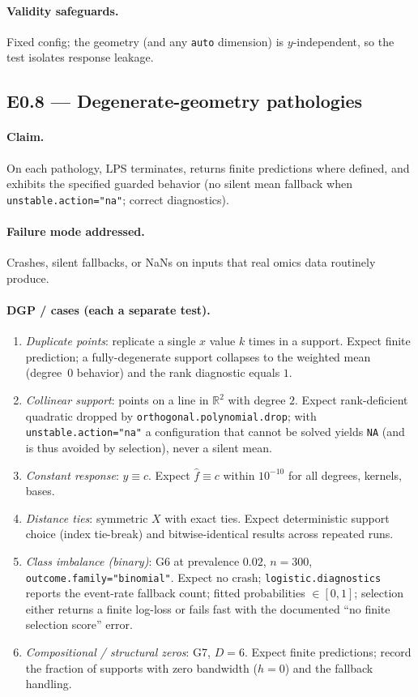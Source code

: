\documentclass[11pt]{article}
\newcommand{\code}[1]{\texttt{#1}}
\begin{document}
\paragraph{Validity safeguards.} Fixed config; the geometry (and any \code{auto} dimension) is
$y$-independent, so the test isolates response leakage.

\subsection{E0.8 — Degenerate-geometry pathologies}

\paragraph{Claim.} On each pathology, LPS terminates, returns finite predictions where defined,
and exhibits the specified guarded behavior (no silent mean fallback when
\code{unstable.action="na"}; correct diagnostics).

\paragraph{Failure mode addressed.} Crashes, silent fallbacks, or NaNs on inputs that
real omics data routinely produce.

\paragraph{DGP / cases (each a separate test).}
\begin{enumerate}[leftmargin=1.4em,nosep]
\item \emph{Duplicate points}: replicate a single $x$ value $k$ times in a support. Expect
finite prediction; a fully-degenerate support collapses to the weighted mean (degree~$0$
behavior) and the rank diagnostic equals $1$.
\item \emph{Collinear support}: points on a line in $\mathbb{R}^2$ with degree $2$. Expect
rank-deficient quadratic dropped by \code{orthogonal.polynomial.drop}; with
\code{unstable.action="na"} a configuration that cannot be solved yields \code{NA} (and is thus
avoided by selection), never a silent mean.
\item \emph{Constant response}: $y\equiv c$. Expect $\hat f\equiv c$ within $10^{-10}$ for all
degrees, kernels, bases.
\item \emph{Distance ties}: symmetric $X$ with exact ties. Expect deterministic support choice
(index tie-break) and bitwise-identical results across repeated runs.
\item \emph{Class imbalance (binary)}: G6 at prevalence $0.02$, $n=300$, \code{outcome.family="binomial"}.
Expect no crash; \code{logistic.diagnostics} reports the event-rate fallback count; fitted
probabilities $\in[0,1]$; selection either returns a finite log-loss or fails fast with the
documented ``no finite selection score'' error.
\item \emph{Compositional / structural zeros}: G7, $D=6$. Expect finite predictions; record the
fraction of supports with zero bandwidth ($h=0$) and the fallback handling.
\end{enumerate}
\end{document}
